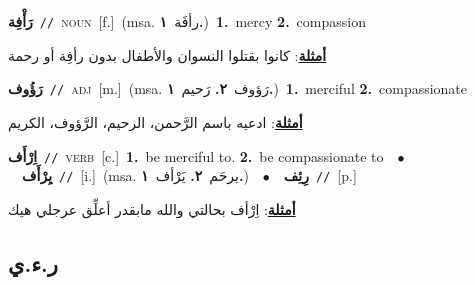 \documentclass[10pt,a4paper,twoside]{article} %
\begin{document}
\begin{multicols}{2}
{{{{{\setlength\topsep{0pt}\textbf{\foreignlanguage{arabic}{رَأْفِة}}\ {\color{gray}\texttt{//}\color{black}}\ \textsc{noun}\ [f.]\ \color{gray}(msa. \foreignlanguage{arabic}{رأفَة}~\foreignlanguage{arabic}{\textbf{١.}})\color{black}\ \textbf{1.}~mercy  \textbf{2.}~compassion\  \begin{flushright}\color{gray}\foreignlanguage{arabic}{\textbf{\underline{\foreignlanguage{arabic}{أمثلة}}}: كانوا بقتلوا النسوان والأطفال بدون رأفِة أو رحمة}\end{flushright}\color{black}} \vspace{2mm}

{\setlength\topsep{0pt}\textbf{\foreignlanguage{arabic}{رَؤُوف}}\ {\color{gray}\texttt{//}\color{black}}\ \textsc{adj}\ [m.]\ \color{gray}(msa. \foreignlanguage{arabic}{رَؤوف}~\foreignlanguage{arabic}{\textbf{٢.}}  \foreignlanguage{arabic}{رَحيم}~\foreignlanguage{arabic}{\textbf{١.}})\color{black}\ \textbf{1.}~merciful  \textbf{2.}~compassionate\  \begin{flushright}\color{gray}\foreignlanguage{arabic}{\textbf{\underline{\foreignlanguage{arabic}{أمثلة}}}: ادعيه باسم الرَّحمن، الرحيم، الرَّؤوف، الكريم}\end{flushright}\color{black}} \vspace{2mm}

{\setlength\topsep{0pt}\textbf{\foreignlanguage{arabic}{اِرْأَف}}\ {\color{gray}\texttt{//}\color{black}}\ \textsc{verb}\ [c.]\ \textbf{1.}~be merciful to.  \textbf{2.}~be compassionate to\ \ $\bullet$\ \ \setlength\topsep{0pt}\textbf{\foreignlanguage{arabic}{يِرْأَف}}\ {\color{gray}\texttt{//}\color{black}}\ [i.]\ \color{gray}(msa. \foreignlanguage{arabic}{يرحَم}~\foreignlanguage{arabic}{\textbf{٢.}}  \foreignlanguage{arabic}{يَرْأف}~\foreignlanguage{arabic}{\textbf{١.}})\color{black}\ \ $\bullet$\ \ \setlength\topsep{0pt}\textbf{\foreignlanguage{arabic}{رِئِف}}\ {\color{gray}\texttt{//}\color{black}}\ [p.]\  \begin{flushright}\color{gray}\foreignlanguage{arabic}{\textbf{\underline{\foreignlanguage{arabic}{أمثلة}}}: اِرْأف بحالتي والله مابقدر أعلِّق عرجلي هيك}\end{flushright}\color{black}} \vspace{2mm}

\vspace{-3mm}
\subsection*{\color{blue}\foreignlanguage{arabic}{ر.ء.ي}\color{blue}{}} 

}}}}
\end{multicols}
\end{document}
